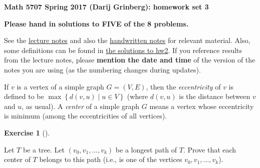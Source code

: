 \documentclass[numbers=enddot,12pt,final,onecolumn,notitlepage]{scrartcl}%
\newcounter{exer}
\theoremstyle{definition}
\newtheorem{exmp}[exer]{Exercise}
\newenvironment{exercise}[1][]
{\begin{exmp}[#1]\begin{leftbar}}
{\end{leftbar}\end{exmp}}
\newcommand{\set}[1]{\left\{ #1 \right\}}
\newcommand{\tup}[1]{\left( #1 \right)}
\begin{document}
\begin{center}
\textbf{Math 5707 Spring 2017 (Darij Grinberg): homework set 3}


\textbf{Please hand in solutions to FIVE of the 8 problems.}
\end{center}

See the
\href{http://www.cip.ifi.lmu.de/~grinberg/t/17s/nogra.pdf}{lecture notes}
and also the
\href{http://www.cip.ifi.lmu.de/~grinberg/t/17s/}{handwritten notes}
for relevant material.
Also, some definitions can be found in
\href{http://www.cip.ifi.lmu.de/~grinberg/t/17s/hw2s.pdf}{the solutions to hw2}.
If you reference results from the lecture notes, please \textbf{mention the date and time} of the version of the notes you are using (as the numbering changes during updates).

If $v$ is a vertex of a simple graph $G = \tup{V, E}$, then the
\textit{eccentricity} of $v$ is defined to be
$\max \set{ d\tup{v, u} \mid u \in V }$ (where $d\tup{v, u}$ is the
distance between $v$ and $u$, as usual). A \textit{center} of a simple
graph $G$ means a vertex whose eccentricity is minimum (among the
eccentricities of all vertices).

\begin{exercise} \label{exe.hw3.centerlp}
Let $T$ be a tree. Let $\tup{v_0, v_1, \ldots, v_k}$ be a longest path
of $T$. Prove that each center of $T$ belongs to this path (i.e., is
one of the vertices $v_0, v_1, \ldots, v_k$).
\end{exercise}
\end{document}
